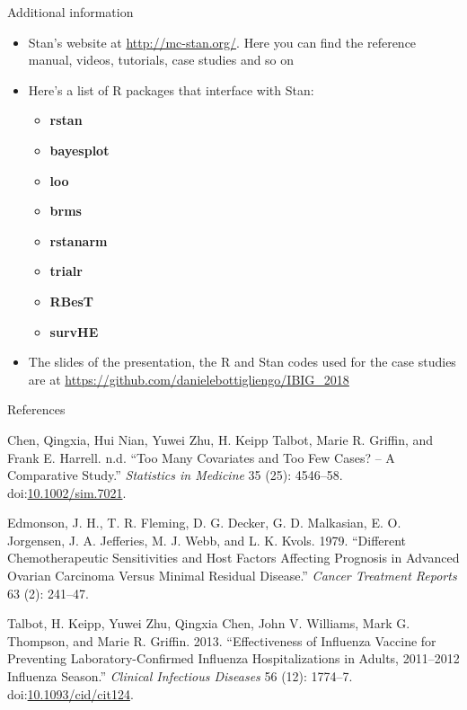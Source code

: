 \documentclass[ignorenonframetext,a4paper]{beamer}
\providecommand{\tightlist}{%
  \setlength{\itemsep}{0pt}\setlength{\parskip}{0pt}}
\begin{document}
\begin{frame}{Additional information}

\begin{itemize}
\item
  Stan's website at \url{http://mc-stan.org/}. Here you can find the
  reference manual, videos, tutorials, case studies and so on
\item
  Here's a list of R packages that interface with Stan:

  \begin{itemize}
  \tightlist
  \item
    \textbf{rstan}
  \item
    \textbf{bayesplot}
  \item
    \textbf{loo}
  \item
    \textbf{brms}
  \item
    \textbf{rstanarm}
  \item
    \textbf{trialr}
  \item
    \textbf{RBesT}
  \item
    \textbf{survHE}
  \end{itemize}
\item
  The slides of the presentation, the R and Stan codes used for the case
  studies are at \url{https://github.com/danielebottigliengo/IBIG_2018}
\end{itemize}

\end{frame}

\begin{frame}{References}

\footnotesize

\hypertarget{refs}{}
\hypertarget{ref-chen_2016}{}
Chen, Qingxia, Hui Nian, Yuwei Zhu, H. Keipp Talbot, Marie R. Griffin,
and Frank E. Harrell. n.d. ``Too Many Covariates and Too Few Cases? -- A
Comparative Study.'' \emph{Statistics in Medicine} 35 (25): 4546--58.
doi:\href{https://doi.org/10.1002/sim.7021}{10.1002/sim.7021}.

\hypertarget{ref-edmonson_1979}{}
Edmonson, J. H., T. R. Fleming, D. G. Decker, G. D. Malkasian, E. O.
Jorgensen, J. A. Jefferies, M. J. Webb, and L. K. Kvols. 1979.
``Different Chemotherapeutic Sensitivities and Host Factors Affecting
Prognosis in Advanced Ovarian Carcinoma Versus Minimal Residual
Disease.'' \emph{Cancer Treatment Reports} 63 (2): 241--47.

\hypertarget{ref-talbot_2013}{}
Talbot, H. Keipp, Yuwei Zhu, Qingxia Chen, John V. Williams, Mark G.
Thompson, and Marie R. Griffin. 2013. ``Effectiveness of Influenza
Vaccine for Preventing Laboratory-Confirmed Influenza Hospitalizations
in Adults, 2011--2012 Influenza Season.'' \emph{Clinical Infectious
Diseases} 56 (12): 1774--7.
doi:\href{https://doi.org/10.1093/cid/cit124}{10.1093/cid/cit124}.

\end{frame}
\end{document}
